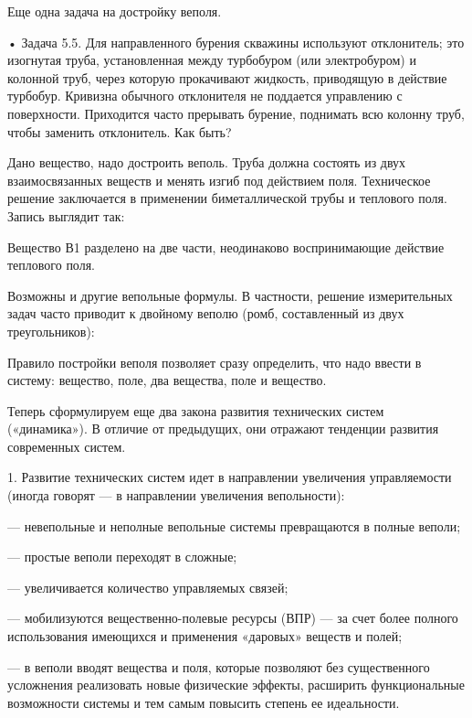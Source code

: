 Еще одна задача на достройку веполя.


•   Задача  5.5.   Для  направленного   бурения  скважины   используют
отклонитель; это изогнутая труба,  установленная между турбобуром (или
электробуром)  и колонной  труб, через  которую прокачивают  жидкость,
приводящую  в  действие  турбобур. Кривизна  обычного  отклонителя  не
поддается  управлению   с  поверхности.  Приходится   часто  прерывать
бурение, поднимать  всю колонну труб, чтобы  заменить отклонитель. Как
быть?


Дано вещество,  надо достроить веполь.  Труба должна состоять  из двух
взаимосвязанных веществ и менять изгиб под действием поля. Техническое
решение  заключается в  применении биметаллической  трубы и  теплового
поля. Запись выглядит так:



Вещество  В1  разделено  на   две  части,  неодинаково  воспринимающие
действие теплового поля.

Возможны   и   другие   вепольные  формулы.   В   частности,   решение
измерительных   задач  часто   приводит  к   двойному  веполю   (ромб,
составленный из двух треугольников):


Правило постройки веполя позволяет сразу определить, что надо ввести в
систему: вещество, поле, два вещества, поле и вещество.


Теперь  сформулируем  еще  два   закона  развития  технических  систем
(«динамика»). В отличие от предыдущих, они отражают тенденции развития
современных систем.




1.  Развитие   технических  систем   идет  в   направлении  увеличения
управляемости (иногда говорят — в направлении увеличения вепольности):

—  невепольные  и неполные  вепольные  системы  превращаются в  полные
веполи;

— простые веполи переходят в сложные;

— увеличивается количество управляемых связей;

—  мобилизуются  вещественно-полевые ресурсы  (ВПР)  —  за счет  более
полного  использования  имеющихся  и применения  «даровых»  веществ  и
полей;

—   в  веполи   вводят  вещества   и  поля,   которые  позволяют   без
существенного   усложнения  реализовать   новые  физические   эффекты,
расширить  функциональные возможности  системы  и  тем самым  повысить
степень ее идеальности.





